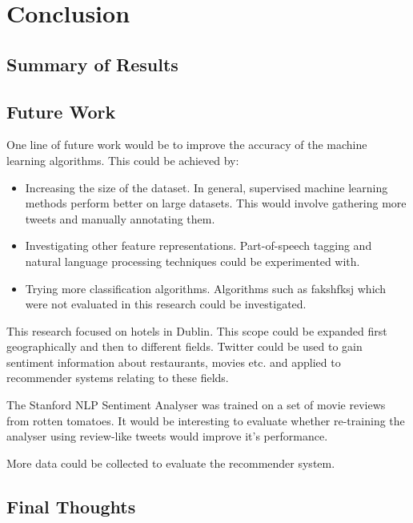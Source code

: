 \chapter{Conclusion}

\section{Summary of Results}

\section{Future Work}
One line of future work would be to improve the accuracy of the machine learning algorithms. This could be achieved by:
\begin{itemize}
    \item Increasing the size of the dataset. In general, supervised machine learning methods perform better on large datasets. This would involve gathering more tweets and manually annotating them.
    \item Investigating other feature representations. Part-of-speech tagging and natural language processing techniques could be experimented with.
    \item Trying more classification algorithms. Algorithms such as fakshfksj which were not evaluated in this research could be investigated. 
\end{itemize}

This research focused on hotels in Dublin. This scope could be expanded first geographically and then to different fields. Twitter could be used to gain sentiment information about restaurants, movies etc. and applied to recommender systems relating to these fields.

The Stanford NLP Sentiment Analyser was trained on a set of movie reviews from rotten tomatoes. It would be interesting to evaluate whether re-training the analyser using review-like tweets would improve it's performance. 

More data could be collected to evaluate the recommender system.

\section{Final Thoughts}